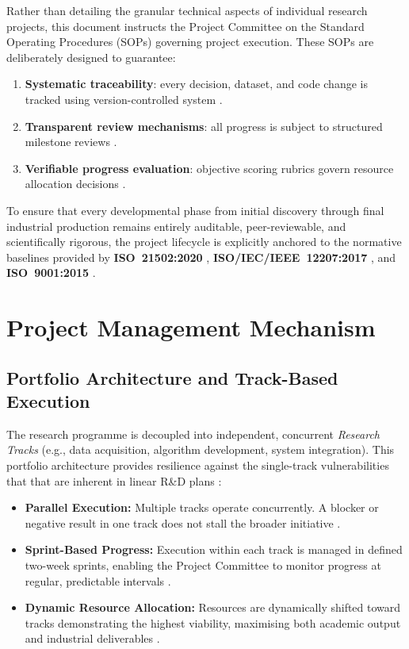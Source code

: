 \documentclass[11pt, a4paper]{article}
\begin{document}
Rather than detailing the granular technical aspects of individual research projects, this document instructs the Project Committee on the Standard Operating Procedures (SOPs) governing project execution. These SOPs are deliberately designed to guarantee:

\begin{enumerate}
    \item \textbf{Systematic traceability}: every decision, dataset, and code change is tracked using version-controlled system \cite{iso_iec_ieee_12207_2017, iso9001_2015}.
    \item \textbf{Transparent review mechanisms}: all progress is subject to structured milestone reviews \cite{cooper2010stage, iso21502_2020}.
    \item \textbf{Verifiable progress evaluation}: objective scoring rubrics govern resource allocation decisions \cite{cooper2017idea, iso21502_2020}.
\end{enumerate}

To ensure that every developmental phase from initial discovery through final industrial production remains entirely auditable, peer-reviewable, and scientifically rigorous, the project lifecycle is explicitly anchored to the normative baselines provided by \textbf{ISO~21502:2020} \cite{iso21502_2020}, \textbf{ISO/IEC/IEEE~12207:2017} \cite{iso_iec_ieee_12207_2017}, and \textbf{ISO~9001:2015} \cite{iso9001_2015}.


\section{Project Management Mechanism}\label{sec:pm}

\subsection{Portfolio Architecture and Track-Based Execution}

The research programme is decoupled into independent, concurrent \emph{Research Tracks} (e.g., data acquisition, algorithm development, system integration). This portfolio architecture provides resilience against the single-track vulnerabilities that that are inherent in linear R\&D plans \cite{wingate2025project}:

\begin{itemize}
    \item \textbf{Parallel Execution:} Multiple tracks operate concurrently. A blocker or negative result in one track does not stall the broader initiative \cite{cooper2010stage}.
    \item \textbf{Sprint-Based Progress:} Execution within each track is managed in defined two-week sprints, enabling the
          Project Committee to monitor progress at regular, predictable intervals \cite{iso21502_2020}.
    \item \textbf{Dynamic Resource Allocation:} Resources are dynamically shifted toward tracks demonstrating the highest viability, maximising both academic output and industrial deliverables \cite{iso21502_2020, wingate2025project, cooper2017idea}.
\end{itemize}
\end{document}
